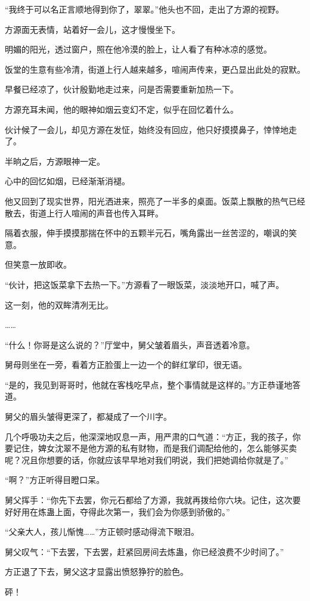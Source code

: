 \begin{this_body}
“我终于可以名正言顺地得到你了，翠翠。”他头也不回，走出了方源的视野。

方源面无表情，站着好一会儿，这才慢慢坐下。

明媚的阳光，透过窗户，照在他冷漠的脸上，让人看了有种冰凉的感觉。

饭堂的生意有些冷清，街道上行人越来越多，喧闹声传来，更凸显出此处的寂默。

早餐已经凉了，伙计殷勤地走过来，问是否需要重新加热一下。

方源充耳未闻，他的眼神如烟云变幻不定，似乎在回忆着什么。

伙计候了一会儿，却见方源在发怔，始终没有回应，他只好摸摸鼻子，悻悻地走了。

半晌之后，方源眼神一定。

心中的回忆如烟，已经渐渐消褪。

他又回到了现实世界，阳光洒进来，照亮了一半多的桌面。饭菜上飘散的热气已经散去，街道上行人喧闹的声音也传入耳畔。

隔着衣服，伸手摸摸那揣在怀中的五颗半元石，嘴角露出一丝苦涩的，嘲讽的笑意。

但笑意一放即收。

“伙计，把这饭菜拿下去热一下。”方源看了一眼饭菜，淡淡地开口，喊了声。

这一刻，他的双眸清冽无比。

……

“什么！你哥是这么说的？”厅堂中，舅父皱着眉头，声音透着冷意。

舅母则坐在一旁，看着方正脸蛋上一边一个的鲜红掌印，很无语。

“是的，我见到哥哥时，他就在客栈吃早点，整个事情就是这样的。”方正恭谨地答道。

舅父的眉头皱得更深了，都凝成了一个川字。

几个呼吸功夫之后，他深深地叹息一声，用严肃的口气道：“方正，我的孩子，你要记住，婢女沈翠不是他方源的私有财物，而是我们调配给他的，怎么能够买卖呢？况且你想要的话，你就应该早早地对我们明说，我们把她调给你就是了。”

“啊？”方正听得目瞪口呆。

舅父挥手：“你先下去罢，你元石都给了方源，我就再拨给你六块。记住，这次要好好用在炼蛊上面，夺得此次第一，我们会为你感到骄傲的。”

“父亲大人，孩儿惭愧……”方正顿时感动得流下眼泪。

舅父叹气：“下去罢，下去罢，赶紧回房间去炼蛊，你已经浪费不少时间了。”

方正退了下去，舅父这才显露出愤怒狰狞的脸色。

砰！


\end{this_body}
